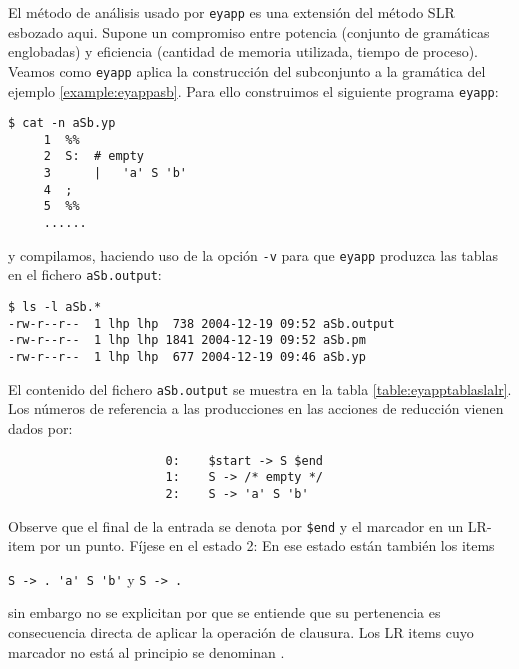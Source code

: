 El método de análisis  usado por \verb|eyapp|
es una extensión del método SLR esbozado
aqui. Supone un compromiso entre potencia (conjunto de gramáticas
englobadas) y eficiencia (cantidad de memoria utilizada, tiempo de
proceso).
Veamos como \verb|eyapp| aplica la construcción del subconjunto a la 
gramática del ejemplo
\ref{example:eyappasb}.
Para ello construimos el siguiente programa \verb|eyapp|:
\begin{verbatim}
$ cat -n aSb.yp
     1  %%
     2  S:  # empty
     3      |   'a' S 'b'  
     4  ;
     5  %%
     ......
\end{verbatim}
y compilamos, haciendo uso de la opción \verb|-v| para que \verb|eyapp| produzca
las tablas en el fichero \verb|aSb.output|:
\begin{verbatim}
$ ls -l aSb.*
-rw-r--r--  1 lhp lhp  738 2004-12-19 09:52 aSb.output
-rw-r--r--  1 lhp lhp 1841 2004-12-19 09:52 aSb.pm
-rw-r--r--  1 lhp lhp  677 2004-12-19 09:46 aSb.yp
\end{verbatim}

El contenido del fichero \verb|aSb.output| se muestra
en la tabla 
\ref{table:eyapptablaslalr}.
Los números de referencia a las producciones en las acciones
de reducción vienen dados por:

\begin{verbatim}
                      0:	$start -> S $end
                      1:	S -> /* empty */
                      2:	S -> 'a' S 'b'
\end{verbatim} 

Observe que el final de la entrada se denota 
por \verb|$end| y el marcador en un LR-item 
por un punto. Fíjese en el estado 2: 
En ese estado están también los items

\begin{center}
 \verb|S -> . 'a' S 'b'|
y \verb|S -> .|
\end{center}

sin embargo no se explicitan
por que se entiende que su pertenencia es
consecuencia directa de aplicar la operación 
de clausura. Los LR items cuyo marcador
no está al principio se denominan
. 

